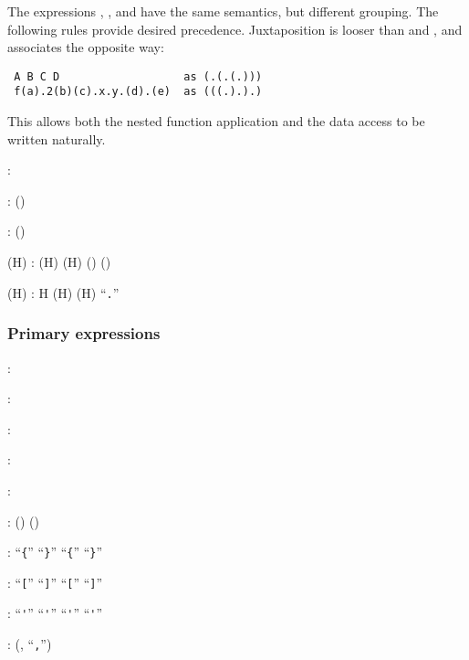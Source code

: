 The expressions , , and  have the
same semantics, but different grouping.  The following rules provide
desired precedence.  Juxtaposition  is looser than
  and , and associates the opposite way:
\begin{verbatim}
 A B C D                   as (.(.(.)))
 f(a).2(b)(c).x.y.(d).(e)  as (((.).).)
\end{verbatim}
This allows both the nested function application  and
the data access  to be written naturally.

: 

: ()

: ()

(H)
: (H)
\Alt{} (H) ()
\Alt{}  ()

(H)
: \altline
H
\Alt{}  
\Alt{} (H)  \altline
\Alt{} (H) ``\verb"."'' 

\subsubsection{Primary expressions}

: 
\Alt{} 

: 
\Alt{} 
\Alt{} 

: 
\Alt{} 

: 
\Alt{} 
\Alt{} 

: 
\Alt{} 

: ()
\Alt{} ()

: ``\verb"{"'' ``\verb"}"'' 
\Alt{} ``\verb"{"''  ``\verb"}"''

: ``\verb"["'' ``\verb"]"'' 
\Alt{} ``\verb"["''  ``\verb"]"'' 

: ``\verb"'"'' ``\verb"'"''
\Alt{} ``\verb"'"''  ``\verb"'"''

: (, ``\verb","'')

